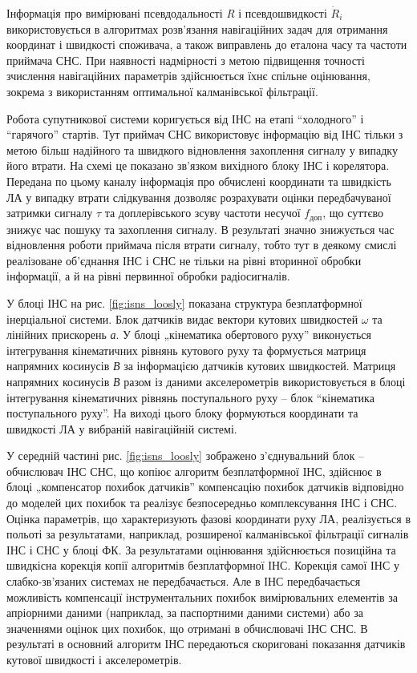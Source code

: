 Інформація про вимірювані псевдодальності \textit{R} і псевдошвидкості $\dot{R}_{i} $ використовується 
в алгоритмах розв'язання навігаційних задач для отримання координат і швидкості споживача, 
а також виправлень до еталона часу та частоти приймача СНС. При наявності надмірності 
з метою підвищення точності зчислення навігаційних параметрів здійснюється їхнє спільне 
оцінювання, зокрема з використанням оптимальної калманівської  фільтрації. 

Робота супутникової системи коригується від ІНС на етапі ``холодного'' і ``гарячого'' 
стартів. Тут приймач СНС використовує інформацію від ІНС тільки з метою 
більш надійного та швидкого відновлення захоплення сигналу у випадку його втрати. 
На схемі це показано зв'язком вихідного блоку ІНС і корелятора. Передана по цьому 
каналу інформація про обчислені координати та швидкість ЛА у випадку втрати слідкування 
дозволяє розрахувати оцінки передбачуваної затримки сигналу $\tau$ та доплерівського 
зсуву частоти несучої $f_{\text{доп}}$, що суттєво знижує час пошуку та захоплення сигналу. 
В результаті значно знижується час відновлення роботи приймача після втрати сигналу, тобто тут в деякому смислі реалізоване об'єднання ІНС і СНС не тільки на рівні вторинної обробки інформації, а й на рівні 
первинної обробки радіосигналів. 

У блоці ІНС на рис. \ref{fig:isns_loosly} показана структура безплатформної інерціальної системи. 
Блок датчиків видає вектори кутових  швидкостей $\omega$ та лінійних прискорень \textit{а}. 
У блоці „кінематика обертового руху'' виконується інтегрування кінематичних рівнянь 
кутового руху та формується матриця напрямних косинусів \textit{В} за інформацією 
датчиків кутових швидкостей. Матриця напрямних косинусів \textit{В} разом із даними 
акселерометрів використовується в блоці інтегрування кінематичних рівнянь поступального 
руху -- блок ``кінематика поступального руху''. На виході цього блоку формуються 
координати та швидкості ЛА у вибраній навігаційній системі.

У середній частині рис. \ref{fig:isns_loosly} зображено з'єднувальний блок -- обчислювач ІНС СНС, 
що копіює алгоритм безплатформної ІНС, здійснює в блоці „компенсатор похибок датчиків'' 
компенсацію похибок датчиків відповідно до моделей цих похибок та реалізує безпосередньо 
комплексування ІНС і СНС. Оцінка параметрів, що характеризують фазові координати 
руху ЛА, реалізується в польоті за результатами, наприклад, розширеної калманівської 
фільтрації сигналів ІНС і СНС у блоці ФК. За результатами оцінювання здійснюється 
позиційна та швидкісна корекція копії алгоритмів безплатформної ІНС. Корекція самої 
ІНС у слабко-зв'язаних системах не передбачається. Але в ІНС передбачається можливість 
компенсації інструментальних похибок вимірювальних елементів за апріорними даними 
(наприклад, за паспортними даними  системи) або за значеннями оцінок цих похибок, 
що отримані в обчислювачі ІНС СНС. В результаті в основний алгоритм ІНС передаються 
скориговані показання датчиків кутової швидкості і акселерометрів.


